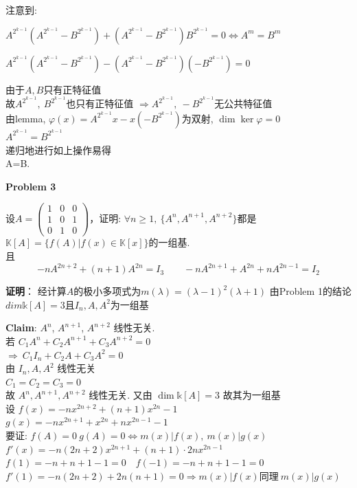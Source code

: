 \begin{enumerate}
注意到:

$A^{2^{k-1}}\left(A^{2^{k-1}} - B^{2^{k-1}}\right) + \left(A^{2^{k-1}} - B^{2^{k-1}}\right)B^{2^{k-1}}=0\Leftrightarrow A^m = B^m$

$A^{2^{k-1}}\left(A^{2^{k-1}} - B^{2^{k-1}}\right) - \left(A^{2^{k-1}} - B^{2^{k-1}}\right)\left(-B^{2^{k-1}}\right)=0$

由于$A,B$只有正特征值\\
故$A^{2^{k-1}},\ B^{2^{k-1}}$也只有正特征值 $\Rightarrow A^{2^{k-1}},\ -B^{2^{k-1}}$无公共特征值\\
由lemma, $\varphi(x)=A^{2^{k-1}}x - x(-B^{2^{k-1}})$为双射, $\dim \ker\varphi=0$\\
$A^{2^{k-1}} = B^{2^{k-1}}$\\
递归地进行如上操作易得\\
A=B.

\textbf{Problem 3}

设$A = \begin{pmatrix} 1 & 0 & 0 \\ 1 & 0 & 1 \\ 0 & 1 & 0 \end{pmatrix}$，证明: $\forall n\geq 1,\ \{A^n, A^{n+1}, A^{n+2}\}$都是$\mathbb{K}[A] = \{f(A) | f(x)\in \mathbb{K}[x]\}$的一组基.\\
且
\[
-nA^{2n+2} + (n+1)A^{2n} = I_3 \qquad -nA^{2n+1} + A^{2n} + nA^{2n-1} = I_2
\]

\textbf{证明}：
经计算$A的极小多项式为 m(\lambda)=(\lambda-1)^{2}(\lambda+1)$
由Problem 1的结论$dim\mathbb{k}[A]=3$且${I_{n}, A , A^{2}}$为一组基

\textbf{Claim}: $A^n$, $A^{n+1}$, $A^{n+2}$ 线性无关.\\
若 $C_1 A^n + C_2 A^{n+1} + C_3 A^{n+2} = 0$\\
$\Rightarrow\ C_1 I_n + C_2 A + C_3 A^2 = 0$\\
由 $I_n, A, A^2$ 线性无关\\
$C_1 = C_2 = C_3 = 0$\\
故 $A^n, A^{n+1}, A^{n+2}$ 线性无关. 又由 $\dim \mathbb{k}[A]=3$ 故其为一组基\\

设 $f(x) = -n x^{2n+2} + (n+1) x^{2n} - 1$\\

\quad$g(x) = -n x^{2n+1} + x^{2n} + n x^{2n-1} - 1$\\

要证: $f(A)=0 \ g(A)=0 \iff m(x)|f(x),\ m(x)|g(x)$\\
$f'(x) = -n(2n+2) x^{2n+1} + (n+1)\cdot 2n x^{2n-1}$\\
$f(1) = -n + n+1 -1 = 0 \quad f(-1) = -n + n+1 -1 = 0$\\
$f'(1) = -n(2n+2) + 2n(n+1) = 0\Rightarrow m(x)|f(x)$同理$\ m(x)|g(x)$\\


\end{enumerate}
